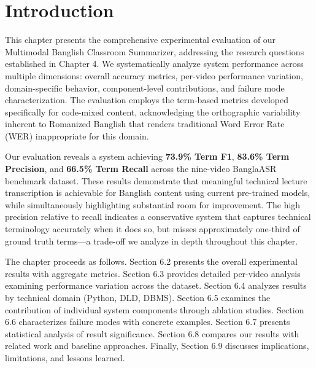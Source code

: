 
\section{Introduction}

This chapter presents the comprehensive experimental evaluation of our Multimodal Banglish Classroom Summarizer, addressing the research questions established in Chapter 4. We systematically analyze system performance across multiple dimensions: overall accuracy metrics, per-video performance variation, domain-specific behavior, component-level contributions, and failure mode characterization. The evaluation employs the term-based metrics developed specifically for code-mixed content, acknowledging the orthographic variability inherent to Romanized Banglish that renders traditional Word Error Rate (WER) inappropriate for this domain.

Our evaluation reveals a system achieving \textbf{73.9\% Term F1}, \textbf{83.6\% Term Precision}, and \textbf{66.5\% Term Recall} across the nine-video BanglaASR benchmark dataset. These results demonstrate that meaningful technical lecture transcription is achievable for Banglish content using current pre-trained models, while simultaneously highlighting substantial room for improvement. The high precision relative to recall indicates a conservative system that captures technical terminology accurately when it does so, but misses approximately one-third of ground truth terms---a trade-off we analyze in depth throughout this chapter.

The chapter proceeds as follows. Section 6.2 presents the overall experimental results with aggregate metrics. Section 6.3 provides detailed per-video analysis examining performance variation across the dataset. Section 6.4 analyzes results by technical domain (Python, DLD, DBMS). Section 6.5 examines the contribution of individual system components through ablation studies. Section 6.6 characterizes failure modes with concrete examples. Section 6.7 presents statistical analysis of result significance. Section 6.8 compares our results with related work and baseline approaches. Finally, Section 6.9 discusses implications, limitations, and lessons learned.

